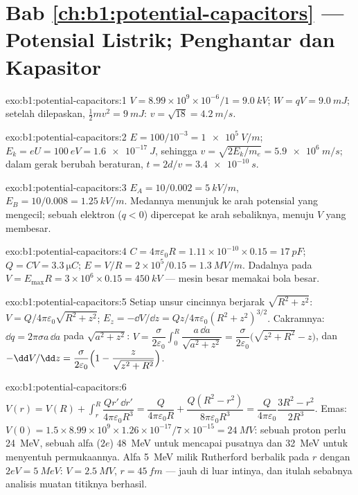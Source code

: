 \section*{Bab \ref{ch:b1:potential-capacitors} --- Potensial Listrik; Penghantar dan Kapasitor}

\begin{solution}{exo:b1:potential-capacitors:1}
$V = 8.99 \times 10^9 \times 10^{-6}/1 = \qty{9.0}{kV}$; $W = qV = \qty{9.0}{mJ}$;
setelah dilepaskan, $\tfrac12mv^2 = \qty{9}{mJ}$: $v = \sqrt{18} = \qty{4.2}{m/s}$.
\end{solution}

\begin{solution}{exo:b1:potential-capacitors:2}
$E = 100/10^{-3} = \qty{1e5}{V/m}$; $E_k = eU = \qty{100}{eV} = \qty{1.6e-17}{J}$,
sehingga $v = \sqrt{2E_k/m_e} = \qty{5.9e6}{m/s}$; dalam gerak berubah beraturan,
$t = 2d/v = \qty{3.4e-10}{s}$.
\end{solution}

\begin{solution}{exo:b1:potential-capacitors:3}
$E_A = 10/0.002 = \qty{5}{kV/m}$, $E_B = 10/0.008 = \qty{1.25}{kV/m}$. Medannya
menunjuk ke arah potensial yang mengecil; sebuah elektron ($q < 0$)
dipercepat ke arah sebaliknya, menuju $V$ yang membesar.
\end{solution}

\begin{solution}{exo:b1:potential-capacitors:4}
$C = 4\pi\varepsilon_0R = 1.11 \times 10^{-10} \times 0.15 = \qty{17}{pF}$; $Q = CV =
\qty{3.3}{\micro C}$; $E = V/R = 2 \times 10^5/0.15 = \qty{1.3}{MV/m}$. Dadalnya
pada $V = E_{\max}R = 3 \times 10^6 \times 0.15 = \qty{450}{kV}$ --- mesin besar
memakai bola besar.
\end{solution}

\begin{solution}{exo:b1:potential-capacitors:5}
Setiap unsur cincinnya berjarak $\sqrt{R^2 + z^2}$: $V =
Q/4\pi\varepsilon_0\sqrt{R^2 + z^2}$; $E_z = -\dd V/\dd z = Qz/4\pi\varepsilon_0(R^2 +
z^2)^{3/2}$. Cakramnya: $\dd q = 2\pi\sigma a\,\dd a$ pada $\sqrt{a^2 + z^2}$: $V =
\dfrac{\sigma}{2\varepsilon_0}\displaystyle\int_0^R\dfrac{a\,\dd a}{\sqrt{a^2 + z^2}} =
\dfrac{\sigma}{2\varepsilon_0}\bigl(\sqrt{z^2 + R^2} - z\bigr)$, dan $-\dd V/\dd z =
\dfrac{\sigma}{2\varepsilon_0}\Bigl(1 - \dfrac{z}{\sqrt{z^2 + R^2}}\Bigr)$.
\end{solution}

\begin{solution}{exo:b1:potential-capacitors:6}
$V(r) = V(R) + \displaystyle\int_r^R\dfrac{Qr'\,\dd r'}{4\pi\varepsilon_0R^3} =
\dfrac{Q}{4\pi\varepsilon_0R} + \dfrac{Q(R^2 - r^2)}{8\pi\varepsilon_0R^3} = \dfrac{Q}{4\pi\varepsilon_0}
\dfrac{3R^2 - r^2}{2R^3}$. Emas: $V(0) = 1.5 \times 8.99 \times 10^9 \times 1.26 \times
10^{-17}/7 \times 10^{-15} = \qty{24}{MV}$: sebuah proton perlu \qty{24}{MeV}, sebuah alfa
($2e$) \qty{48}{MeV} untuk mencapai pusatnya dan \qty{32}{MeV} untuk menyentuh
permukaannya. Alfa \qty{5}{MeV} milik Rutherford berbalik pada $r$ dengan $2eV =
\qty{5}{MeV}$: $V = \qty{2.5}{MV}$, $r = \qty{45}{fm}$ --- jauh di luar
intinya, dan itulah sebabnya analisis muatan titiknya berhasil.
\end{solution}

